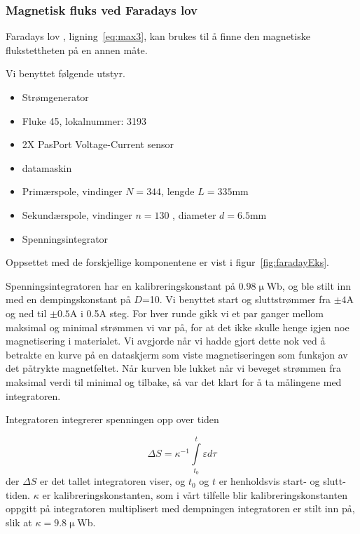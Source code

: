 \documentclass[a4paper,11pt, twocolumn]{article}
\begin{document}
\subsubsection{Magnetisk fluks ved Faradays lov}
Faradays lov , ligning~\eqref{eq:max3}, kan brukes til å finne den magnetiske flukstettheten på en annen måte.

Vi benyttet følgende utstyr.
\begin{itemize}
	\item Strømgenerator
	\item Fluke 45, lokalnummer: 3193
	\item 2X PasPort Voltage-Current sensor
	\item datamaskin
	\item Primærspole, vindinger $N = 344$, lengde $L = 335$mm 
	\item Sekundærspole, vindinger $n = 130$ , diameter $d = 6.5$mm 
	\item Spenningsintegrator
\end{itemize}

Oppsettet med de forskjellige komponentene er vist i figur~\ref{fig:faradayEks}. 

Spenningsintegratoren har en kalibreringskonstant på $0.98\upmu$Wb, og ble stilt inn med en dempingskonstant på $D$=10. Vi benyttet start og sluttstrømmer fra $\pm4$A og ned til $\pm0.5$A i 0.5A steg. For hver runde gikk vi et par ganger mellom maksimal og minimal strømmen vi var på, for at det ikke skulle henge igjen noe magnetisering i materialet. Vi avgjorde når vi hadde gjort dette nok ved å betrakte en kurve på en dataskjerm som viste magnetiseringen som funksjon av det påtrykte magnetfeltet. Når kurven ble lukket når vi beveget strømmen fra maksimal verdi til minimal og tilbake, så var det klart for å ta målingene med integratoren.

Integratoren integrerer spenningen opp over tiden

\begin{equation}
	\Delta S = \kappa^{-1}\int\limits_{t_0}^t \varepsilon d\tau
	\label{eq:spenningsint}
\end{equation}
der $\Delta S$ er det tallet integratoren viser, og $t_0$ og $t$ er henholdsvis start- og slutt-tiden. $\kappa$ er kalibreringskonstanten, som i vårt tilfelle blir kalibreringskonstanten oppgitt på integratoren multiplisert med dempningen integratoren er stilt inn på, slik at $\kappa=9.8\upmu$Wb.
\end{document}
